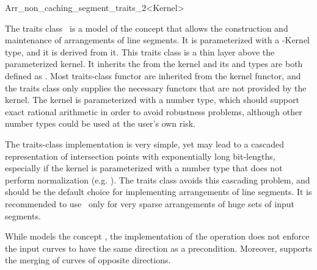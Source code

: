 
\ccRefPageBegin

\begin{ccRefClass}{Arr_non_caching_segment_traits_2<Kernel>}
    
\ccDefinition 

The traits class \ccRefName\ is a model of the 
concept that allows the construction and maintenance of arrangements of
line segments. It is parameterized with a \cgal-Kernel type, and it
is derived from it. This traits class is a thin layer above the
parameterized kernel. It inherits the  from the kernel and its
 and  types are both defined as
. Most traits-class functor are inherited from the
kernel functor, and the traits class only supplies the necessary functors
that are not provided by the kernel. The kernel is parameterized with a
number type, which should support exact rational arithmetic in order to
avoid robustness problems, although other number types could be used at the
user's own risk.

The traits-class implementation is very simple, yet may lead to
a cascaded representation of intersection points with exponentially long
bit-lengths, especially if the kernel is parameterized with a number type
that does not perform normalization (e.g. ).
The  traits class avoids this cascading
problem, and should be the default choice for implementing arrangements of
line segments. It is recommended to use \ccRefName\ only for very sparse
arrangements of huge sets of input segments.

While \ccRefName{} models the concept
, the implementation of
the  operation does not enforce the input curves
to have the same direction as a precondition. Moreover, \ccRefName{}
supports the merging of curves of opposite directions.

 
\ccIsModel
    \\
    \\

\ccInheritsFrom

\ccSeeAlso

\end{ccRefClass}
\ccRefPageEnd
